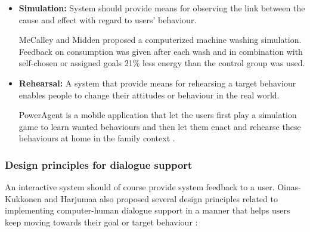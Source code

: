 \begin{itemize}
	\item \textbf{Simulation:}
	System should provide means for observing the link between the cause and effect with regard to users’ behaviour.
	
	McCalley and Midden \cite{mccalley2002energy} proposed a computerized	machine washing	simulation. Feedback on consumption was given after	each wash and in combination with self-chosen or assigned goals 21\% less energy than the control group was used.
		
	\item \textbf{Rehearsal:}
	A system that provide means for rehearsing a target behaviour enables people to change their attitudes or behaviour in the real world.
	
	PowerAgent is a mobile application that let the users first play a simulation game to learn wanted behaviours and then let them enact and rehearse these behaviours at home in the family context \cite{bang2007promoting}.
\end{itemize}


\subsubsection{Design principles for dialogue support}
\label{subsec:dialogueSupport}

An interactive system should of course provide system feedback to a user. Oinas-Kukkonen and Harjumaa also proposed several design principles related to implementing computer-human dialogue support in a manner that helps users keep moving towards their goal or target behaviour \cite{oinas2009persuasive}:

